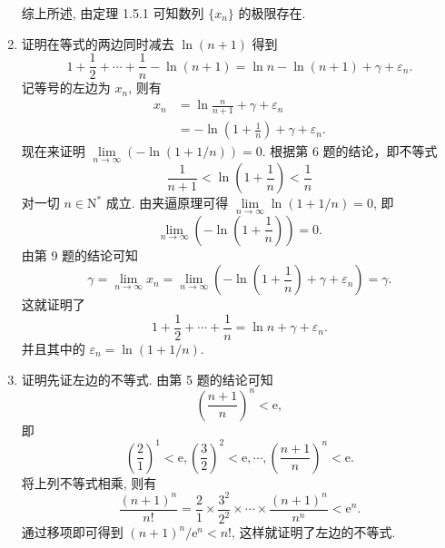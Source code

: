 \begin{enumerate}
        综上所述, 由定理 1.5.1 可知数列 $\{x_n\}$ 的极限存在.
    \item {\heiti 证明}\quad 在等式的两边同时减去 $\ln(n+1)$ 得到
        \begin{equation*}
            1 + \frac12 + \cdots + \frac1n - \ln(n+1) = \ln n - \ln(n+1) + \gamma + \varepsilon_n.
        \end{equation*}
        记等号的左边为 $x_n$, 则有
        \begin{align*}
            x_n &= \ln\frac{n}{n+1} + \gamma + \varepsilon_n \\
            &= -\ln\left(1+\frac1n\right) + \gamma + \varepsilon_n.
        \end{align*}
        现在来证明 $\lim\limits_{n\to\infty}(-\ln(1 + 1/n)) = 0$. 根据第 6 题的结论，即不等式
        \[
            \frac{1}{n+1} < \ln\left(1 + \frac1n\right) < \frac1n    
        \]
        对一切 $n \in \mathrm{N}^*$ 成立. 由夹逼原理可得 $\lim\limits_{n\to\infty}\ln(1 + 1/n) = 0$, 即
        \[
            \lim\limits_{n\to\infty}\left(-\ln\left(1 + \frac1n\right)\right) = 0.  
        \]
        由第 9 题的结论可知
        \[
            \gamma = \lim\limits_{n\to\infty}x_n = \lim\limits_{n\to\infty}\left(-\ln\left(1 + \frac1n\right) + \gamma + \varepsilon_n\right) = \gamma.
        \]
        这就证明了
        \[
            1 + \frac12 + \cdots + \frac1n = \ln n + \gamma + \varepsilon_n.  
        \]
        并且其中的 $\varepsilon_n = \ln(1 + 1/n)$.
    \item {\heiti 证明}\quad 先证左边的不等式. 由第 5 题的结论可知
        \[
            \left(\frac{n+1}{n}\right)^n < \mathrm{e},    
        \]
        即
        \begin{equation*}
            \left(\frac21\right)^1 < \mathrm{e},
            \left(\frac32\right)^2 < \mathrm{e},
            \cdots,
            \left(\frac{n+1}{n}\right)^n < \mathrm{e}.
        \end{equation*}
        将上列不等式相乘, 则有
        \[
            \frac{(n+1)^n}{n!} = \frac21\times\frac{3^2}{2^2}\times\cdots\times\frac{(n+1)^n}{n^n} < \mathrm{e}^n.    
        \]
        通过移项即可得到 $(n+1)^n/\mathrm{e}^n < n!$, 这样就证明了左边的不等式.


\end{enumerate}
